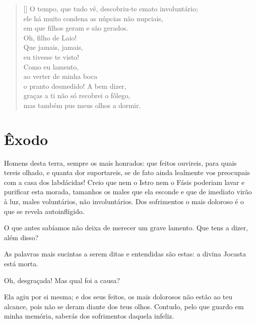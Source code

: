 \settowidth{\versewidth}{ele há muito condena as núpcias não nupciais,}
\begin{verse}[\versewidth] 
O tempo, que tudo vê, descobriu-te em\qb ato involuntário;\\ 
ele há muito condena as núpcias não nupciais,\\
em que filhos geram e são gerados.\\
Oh, filho de Laio!\\
Que jamais, jamais,\\
eu tivesse te visto!\\
Como eu lamento,\\
ao verter de minha boca\\
o pranto desmedido! A bem dizer,\\
graças a ti não só recobrei o fôlego,\\
mas também pus meus olhos a dormir.
\end{verse}


\section{Êxodo}


   Homens desta terra, sempre os mais honrados: que feitos ouvireis, para
quais tereis olhado, e quanta dor suportareis, se de fato ainda lealmente
vos preocupais com a casa dos labdácidas! Creio que nem o Istro nem o
Fásis poderiam lavar e purificar esta morada, tamanhos os males que ela
esconde e que de imediato virão à luz, males voluntários, não
involuntários. Dos sofrimentos o mais doloroso é o que se revela
autoinfligido.

   O que antes sabíamos não deixa de merecer um grave lamento. Que tens a
dizer, além disso?

   As palavras mais sucintas a serem ditas e entendidas são estas: a divina
Jocasta está morta.

   Oh, desgraçada! Mas qual foi a causa?

   Ela agiu por si mesma; e dos seus feitos, os mais dolorosos não estão ao
teu alcance, pois não se deram diante dos teus olhos. Contudo, pelo que
guardo em minha memória, saberás dos sofrimentos daquela infeliz.

